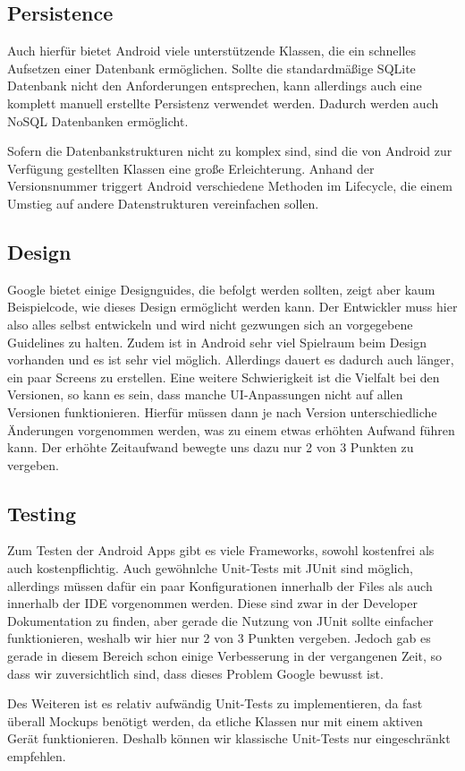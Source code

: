 \subsection{Persistence}
Auch hierfür bietet Android viele unterstützende Klassen, die ein schnelles Aufsetzen einer Datenbank ermöglichen. Sollte die standardmäßige SQLite Datenbank nicht den Anforderungen entsprechen, kann allerdings auch eine komplett manuell erstellte Persistenz verwendet werden. Dadurch werden auch NoSQL Datenbanken ermöglicht.

Sofern die Datenbankstrukturen nicht zu komplex sind, sind die von Android zur Verfügung gestellten Klassen eine große Erleichterung. Anhand der Versionsnummer triggert Android verschiedene Methoden im Lifecycle, die einem Umstieg auf andere Datenstrukturen vereinfachen sollen.

\subsection{Design}
Google bietet einige Designguides, die befolgt werden sollten, zeigt aber kaum Beispielcode, wie dieses Design ermöglicht werden kann. Der Entwickler muss hier also alles selbst entwickeln und wird nicht gezwungen sich an vor\-ge\-gebene Guidelines zu halten. Zudem ist in Android sehr viel Spielraum beim Design vorhanden und es ist sehr viel möglich. Allerdings dauert es dadurch auch länger, ein paar Screens zu erstellen. Eine weitere Schwierigkeit ist die Vielfalt bei den Versionen, so kann es sein, dass manche UI-An\-passungen nicht auf allen Versionen funktionieren. Hierfür müssen dann je nach Version unterschiedliche Änderungen vorgenommen werden, was zu einem etwas erhöhten Aufwand führen kann. Der erhöhte Zeitaufwand bewegte uns dazu nur 2 von 3 Punkten zu vergeben.

\subsection{Testing}
Zum Testen der Android Apps gibt es viele Frameworks, sowohl kostenfrei als auch kostenpflichtig. Auch gewöhnlche Unit-Tests mit JUnit sind möglich, allerdings müssen dafür ein paar Konfigurationen innerhalb der Files als auch innerhalb der IDE vorgenommen werden. Diese sind zwar in der Developer Dokumentation zu finden, aber gerade die Nutzung von JUnit sollte einfacher funktionieren, weshalb wir hier nur 2 von 3 Punkten vergeben. Jedoch gab es gerade in diesem Bereich schon einige Verbesserung in der vergangenen Zeit, so dass wir zuversichtlich sind, dass dieses Problem Google bewusst ist.

Des Weiteren ist es relativ aufwändig Unit-Tests zu implementieren, da fast überall Mockups benötigt werden, da etliche Klassen nur mit einem aktiven Gerät funktionieren. Deshalb können wir klassische Unit-Tests nur eingeschränkt empfehlen.
